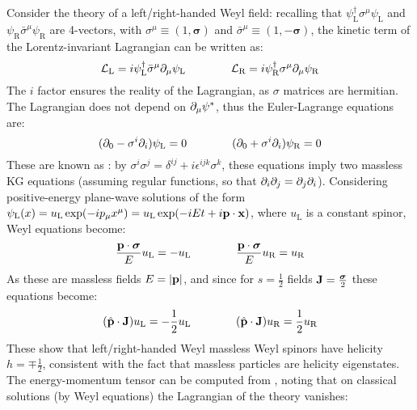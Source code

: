 Consider the theory of a left/right-handed Weyl field: recalling that $ \psi_\text{L}^\dagger \sigma^\mu \psi_\text{L} $ and $ \psi_\text{R} \bar{\sigma}^\mu \psi_\text{R} $ are 4-vectors, with $ \sigma^\mu \equiv (1, \boldsymbol{\sigma}) $ and $ \bar{\sigma}^\mu \equiv (1, - \boldsymbol{\sigma}) $, the kinetic term of the Lorentz-invariant Lagrangian can be written as:
\begin{equation}
  \mathcal{L}_\text{L} = i \psi_\text{L}^\dagger \bar{\sigma}^\mu \partial_\mu \psi_\text{L}
  \qquad \qquad
  \mathcal{L}_\text{R} = i \psi_\text{R}^\dagger \sigma^\mu \partial_\mu \psi_\text{R}
\end{equation}
The $ i $ factor ensures the reality of the Lagrangian, as $ \sigma $ matrices are hermitian. The Lagrangian does not depend on $ \partial_\mu \psi^* $, thus the Euler-Lagrange equations are:
\begin{equation}
  (\partial_0 - \sigma^i \partial_i) \psi_\text{L} = 0
  \qquad \qquad
  (\partial_0 + \sigma^i \partial_i) \psi_\text{R} = 0
\end{equation}
These are known as : by $ \sigma^i \sigma^j = \delta^{ij} + i \epsilon^{ijk} \sigma^k $, these equations imply two massless KG equations (assuming regular functions, so that $ \partial_i \partial_j = \partial_j \partial_i $). Considering positive-energy plane-wave solutions of the form $ \psi_\text{L}(x) = u_\text{L} \exp(-i p_\mu x^\mu) = u_\text{L} \exp(-i E t + i \mathbf{p} \cdot \mathbf{x}) $, where $ u_\text{L} $ is a constant spinor, Weyl equations become:
\begin{equation*}
  \frac{\mathbf{p} \cdot \boldsymbol{\sigma}}{E} u_\text{L} = - u_\text{L}
  \qquad \qquad
  \frac{\mathbf{p} \cdot \boldsymbol{\sigma}}{E} u_\text{R} = u_\text{R}
\end{equation*}
As these are massless fields $ E = \left\lvert\mathbf{p}\right\rvert $, and since for $ s = \frac{1}{2} $ fields $ \mathbf{J} = \frac{\boldsymbol{\sigma}}{2} $ these equations become:
\begin{equation*}
  (\hat{\mathbf{p}} \cdot \mathbf{J}) u_\text{L} = - \frac{1}{2} u_\text{L}
  \qquad \qquad
  (\hat{\mathbf{p}} \cdot \mathbf{J}) u_\text{R} = \frac{1}{2} u_\text{R}
\end{equation*}
These show that left/right-handed Weyl massless Weyl spinors have helicity $ h = \mp \frac{1}{2} $, consistent with the fact that massless particles are helicity eigenstates.\\
The energy-momentum tensor can be computed from , noting that on classical solutions (by Weyl equations) the Lagrangian of the theory vanishes:
